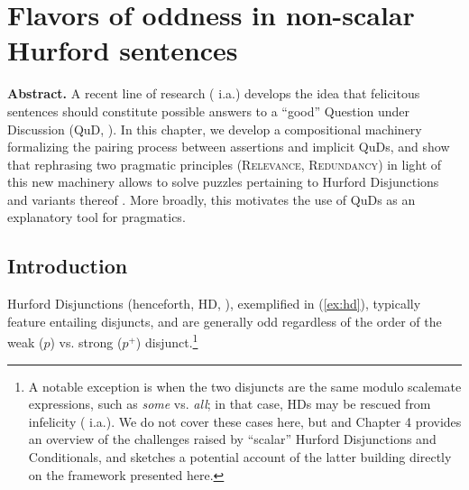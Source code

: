 \chapter{Flavors of oddness in non-scalar Hurford sentences}\label{chap:hurford-sentences}



	\textbf{Abstract. } A recent line of research (\cite{Katzir2015} i.a.) develops the idea that felicitous sentences should constitute possible answers to a ``good'' Question under Discussion (QuD, \cite{Roberts1996,VanKuppevelt1995}). In this chapter, we develop a compositional machinery formalizing the pairing process between assertions and implicit QuDs, and show that rephrasing two pragmatic principles (\textsc{Relevance}, \textsc{Redundancy}) in light of this new machinery  allows to solve puzzles pertaining to Hurford Disjunctions \cite{Hurford1974} and variants thereof \cite{Marty2022,Mandelkern2018}. More broadly, this motivates the use of QuDs as an explanatory tool for pragmatics.





\section{Introduction}

Hurford Disjunctions (henceforth, HD, \cite{Hurford1974}), exemplified in (\ref{ex:hd}), typically feature entailing disjuncts, and are generally odd regardless of the order of the weak ($p$) vs. strong ($p^+$) disjunct.\footnote{A notable exception is when the two disjuncts are the same modulo scalemate expressions, such as \textit{some} vs. \textit{all}; in that case, HDs may be rescued from infelicity (\cite{Gazdar1979,Singh2008b,Fox2018,HenotMortier2022} i.a.). We do not cover these cases here, but \cite{HenotMortier2024a} and Chapter 4 provides an overview of the challenges raised by ``scalar'' Hurford Disjunctions and Conditionals, and sketches a potential account of the latter building directly on the framework presented here.}

\begin{exe}
	\ex \label{ex:hd}
	\begin{xlist}
		\label{ex:hd-sw}
		\label{ex:hd-ws}
	\end{xlist}
\end{exe}

